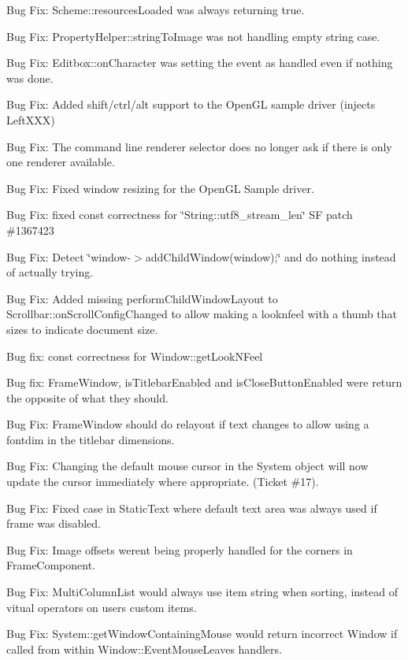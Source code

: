 \begin{DoxyItemize}
\item Bug Fix\+: Scheme\+::resources\+Loaded was always returning true.
\item Bug Fix\+: Property\+Helper\+::string\+To\+Image was not handling empty string case.
\item Bug Fix\+: Editbox\+::on\+Character was setting the event as handled even if nothing was done.
\item Bug Fix\+: Added shift/ctrl/alt support to the Open\+GL sample driver (injects Left\+X\+XX)
\item Bug Fix\+: The command line renderer selector does no longer ask if there is only one renderer available.
\item Bug Fix\+: Fixed window resizing for the Open\+GL Sample driver.
\item Bug Fix\+: fixed const correctness for \char`\"{}\+String\+::utf8\+\_\+stream\+\_\+len\char`\"{} SF patch \#1367423
\item Bug Fix\+: Detect \char`\"{}window-\/$>$add\+Child\+Window(window);\char`\"{} and do nothing instead of actually trying.
\item Bug Fix\+: Added missing perform\+Child\+Window\+Layout to Scrollbar\+::on\+Scroll\+Config\+Changed to allow making a look\textquotesingle{}n\textquotesingle{}feel with a thumb that sizes to indicate document size.
\item Bug fix\+: const correctness for Window\+::get\+Look\+N\+Feel
\item Bug fix\+: Frame\+Window, is\+Titlebar\+Enabled and is\+Close\+Button\+Enabled were return the opposite of what they should.
\item Bug Fix\+: Frame\+Window should do relayout if text changes to allow using a fontdim in the titlebar dimensions.
\item Bug Fix\+: Changing the default mouse cursor in the System object will now update the cursor immediately where appropriate. (Ticket \#17).
\item Bug Fix\+: Fixed case in Static\+Text where default text area was always used if frame was disabled.
\item Bug Fix\+: Image offsets were\textquotesingle{}nt being properly handled for the corners in Frame\+Component.
\item Bug Fix\+: Multi\+Column\+List would always use item string when sorting, instead of vitual operators on users custom items.
\item Bug Fix\+: System\+::get\+Window\+Containing\+Mouse would return incorrect Window if called from within Window\+::\+Event\+Mouse\+Leaves handlers.

\end{DoxyItemize}
